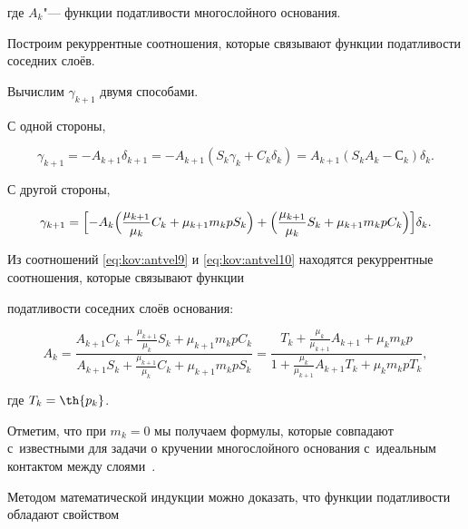 где $A_{k}$"--- функции податливости многослойного основания.



Построим рекуррентные соотношения, которые связывают функции податливости соседних слоёв. 

Вычислим $\gamma_{k+1}$  двумя способами.

С одной стороны,

\begin{equation}

\gamma_{k+1}=-A_{k+1}\delta_{k+1}=-A_{k+1}(S_{k}\gamma_{k}+C_{k}\delta_{k}) =A_{k+1}(S_{k}A_{k}-С_{k})\delta_{k}.

\label{eq:kov:antvel9}

\end{equation}

С другой стороны,

\begin{equation}

\gamma_{k+1}= \Bigl[-A_{k} \Bigl(\frac{\mu_{k+1}}{\mu_{k}}C_{k}+\mu_{k+1}m_{k}p S_{k} \Bigr)+ \Bigl(\frac{\mu_{k+1}}{\mu_{k}}S_{k}+\mu_{k+1}m_{k}pC_{k}\Bigr)\Bigr]\delta_{k}.

\label{eq:kov:antvel10}

\end{equation}

Из соотношений \eqref{eq:kov:antvel9} и \eqref{eq:kov:antvel10} находятся рекуррентные соотношения, которые связывают функции 

податливости соседних слоёв основания:

\begin{equation}

A_{k}=\frac{A_{k+1}C_{k}+\frac{\mu_{k+1}}{\mu_{k}}S_{k}+\mu_{k+1}m_{k}pC_{k}}{A_{k+1}S_{k}+\frac{\mu_{k+1}}{\mu_{k}}C_{k}+\mu_{k+1}m_{k}pS_{k}}

=\frac{T_{k}+\frac{\mu_{k}}{\mu_{k+1}}A_{k+1}+\mu_{k}m_{k}p}{1+\frac{\mu_{k}}{\mu_{k+1}}A_{k+1}T_{k}+\mu_{k}m_{k}pT_{k}},

\label{eq:kov:antvel11}

\end{equation}

где $T_{k}=\th{p_{k}}$.



Отметим, что при $m_{k}=0$ мы получаем формулы, которые совпадают с~известными для задачи о кручении многослойного основания с~идеальным контактом между  слоями~\cite{antvel:bib:VelSteg-ru}. 

Методом математической индукции можно доказать, что функции податливости обладают свойством

